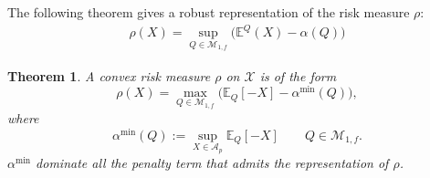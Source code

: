 \documentclass[a4paper,11pt]{book}
\newtheorem{theorem}{Theorem}[section]
\theoremstyle{definition}
\theoremstyle{remark}
\begin{document}
The following theorem gives a robust representation of the risk measure $\rho$: 
\begin{align*}
	\rho(X) = \sup_{Q \in \mathcal{M}_{1, f}} \bigg( \mathbb{E}^Q(X) - \alpha (Q) \bigg)
\end{align*}

\begin{theorem}
	A convex risk measure $\rho$ on $\mathcal{X}$ is of the form
	\begin{equation}
		\rho(X) = \max_{Q \in \mathcal{M}_{1, f}}  \bigg(\mathbb{E}_Q[-X] - \alpha^{\min}(Q) \bigg),
	\end{equation}
	where
	\begin{equation}
		\alpha^{\min}(Q):= \sup_{X \in \mathcal{A}_p}  \mathbb{E}_Q [-X]  \qquad Q \in \mathcal{M}_{1, f}.
	\end{equation} 
	$\alpha^{\min}$ dominate all the penalty term that admits the representation of $\rho$. 
\end{theorem}
\end{document}
